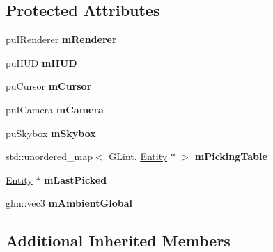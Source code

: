 \subsection*{Protected Attributes}
\begin{DoxyCompactItemize}
\item 
pu\+I\+Renderer {\bfseries m\+Renderer}\hypertarget{classflw_1_1flf_1_1Scene_ab2fc1fcac252a22b0accfa631690a57e}{}\label{classflw_1_1flf_1_1Scene_ab2fc1fcac252a22b0accfa631690a57e}

\item 
pu\+H\+UD {\bfseries m\+H\+UD}\hypertarget{classflw_1_1flf_1_1Scene_a8f42fa512174eb50b2866887ecac5252}{}\label{classflw_1_1flf_1_1Scene_a8f42fa512174eb50b2866887ecac5252}

\item 
pu\+Cursor {\bfseries m\+Cursor}\hypertarget{classflw_1_1flf_1_1Scene_aab97f3319aa2e51ff46b879201b0b5f5}{}\label{classflw_1_1flf_1_1Scene_aab97f3319aa2e51ff46b879201b0b5f5}

\item 
pu\+I\+Camera {\bfseries m\+Camera}\hypertarget{classflw_1_1flf_1_1Scene_a70bf7023f50a264c21b100cb74b42724}{}\label{classflw_1_1flf_1_1Scene_a70bf7023f50a264c21b100cb74b42724}

\item 
pu\+Skybox {\bfseries m\+Skybox}\hypertarget{classflw_1_1flf_1_1Scene_a2725c8c6688e40cb22dc3c51d60e8b09}{}\label{classflw_1_1flf_1_1Scene_a2725c8c6688e40cb22dc3c51d60e8b09}

\item 
std\+::unordered\+\_\+map$<$ G\+Lint, \hyperlink{classflw_1_1flf_1_1Entity}{Entity} $\ast$ $>$ {\bfseries m\+Picking\+Table}\hypertarget{classflw_1_1flf_1_1Scene_ad7823624ce2878347b4d31a5849690be}{}\label{classflw_1_1flf_1_1Scene_ad7823624ce2878347b4d31a5849690be}

\item 
\hyperlink{classflw_1_1flf_1_1Entity}{Entity} $\ast$ {\bfseries m\+Last\+Picked}\hypertarget{classflw_1_1flf_1_1Scene_aaa3466513613f1bfd1b430fa3d2e881c}{}\label{classflw_1_1flf_1_1Scene_aaa3466513613f1bfd1b430fa3d2e881c}

\item 
glm\+::vec3 {\bfseries m\+Ambient\+Global}\hypertarget{classflw_1_1flf_1_1Scene_acefee9ade6d5682058d21af96c0d0b6f}{}\label{classflw_1_1flf_1_1Scene_acefee9ade6d5682058d21af96c0d0b6f}

\end{DoxyCompactItemize}
\subsection*{Additional Inherited Members}


